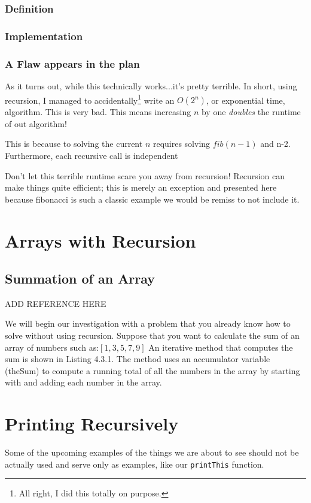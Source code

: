 \subsubsection{Definition}

\subsubsection{Implementation}


\subsubsection{A Flaw appears in the plan}
As it turns out, while this technically works...it's pretty terrible.  In short, using recursion, I managed to accidentally\footnote{All right, I did this totally on purpose.} write an $ O(2^n) $, or exponential time,  algorithm.  This is very bad.  This means increasing $ n $ by one \emph{doubles} the runtime of out algorithm!

This is because to solving the current $n$ requires solving $fib(n-1)$ and n-2.  Furthermore, each recursive call is independent



Don't let this terrible runtime scare you away from recursion!  Recursion can make things quite efficient; this is merely an exception and presented here because fibonacci is such a classic example we would be remiss to not include it.  


\section{Arrays with Recursion}


\subsection{Summation of an Array}
ADD REFERENCE HERE


We will begin our investigation with a problem that you already know how to solve without using recursion. Suppose that you want to calculate the sum of an array of numbers such as:$[1, 3, 5, 7, 9]$ An iterative method that computes the sum is shown in Listing 4.3.1. The method uses an accumulator variable (theSum) to compute a running total of all the numbers in the array by starting with and adding each number in the array.

\section{Printing Recursively}
Some of the upcoming examples  of the things we are about to see should not be actually  used and serve only as examples, like our \texttt{printThis} function.



